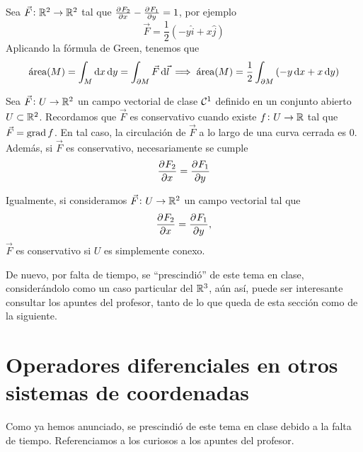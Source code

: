 \begin{example}
    Sea $\vec{F} \colon \mathbb{R}^2 \to \mathbb{R}^2$ tal que $\frac{\partial^{} F_2}{\partial x^{}} - \frac{\partial^{} F_1}{\partial y^{}} = 1$, por ejemplo
    \[
        \vec{F} = \frac{1}{2} \left( -y \hat{i} + x \hat{j} \right)
    \]
    Aplicando la fórmula de Green, tenemos que
    \[
        \text{área}(M) = \int_M \dif x \dif y = \int_{\partial M} \vec{F} \dif \vec{l} \implies
        \text{área}(M) = \frac{1}{2} \int_{\partial M} \left( -y \dif x + x \dif y \right)
    \]
\end{example}

\begin{prop}
    Sea $\vec{F} \colon U \to \mathbb{R}^2$ un campo vectorial de clase $\mathcal{C}^1$ definido en un conjunto abierto $U \subset \mathbb{R}^2$.
    Recordamos que $\vec{F}$ es conservativo cuando existe $f \colon U \to \mathbb{R}$ tal que $\vec{F} = \operatorname{grad} f$. En tal caso, la
    circulación de $\vec{F}$ a lo largo de una curva cerrada es 0. Además, si $\vec{F}$ es conservativo, necesariamente se cumple
    \[
        \frac{\partial^{} F_2}{\partial x^{}} = \frac{\partial^{} F_1}{\partial y^{}}
    \]
\end{prop}

\begin{prop}
    Igualmente, si consideramos $\vec{F} \colon U \to \mathbb{R}^2$ un campo vectorial tal que
    \[
        \frac{\partial^{} F_2}{\partial x^{}} = \frac{\partial^{} F_1}{\partial y^{}},
    \]
    $\vec{F}$ es conservativo si $U$ es simplemente conexo.
\end{prop}


De nuevo, por falta de tiempo, se ``prescindió'' de este tema en clase, considerándolo como un caso particular del $\mathbb{R}^3$, aún
así, puede ser interesante consultar los apuntes del profesor, tanto de lo que queda de esta sección como de la siguiente.


\section[Operadores diferenciales en otros sistemas de coordenadas]{
        Operadores diferenciales en otros sistemas de coordenadas
        }

Como ya hemos anunciado, se prescindió de este tema en clase debido a la falta de tiempo. Referenciamos a los curiosos a los apuntes del
profesor.
